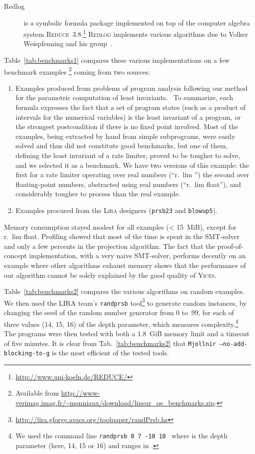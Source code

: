 \begin{description}
\item[Redlog\footnotemark] is a symbolic formula package implemented on top of the computer algebra system \textsc{Reduce}~3.8.\footnote{\url{http://www.uni-koeln.de/REDUCE/}} \textsc{Redlog} implements various algorithms due to Volker Weispfenning and his group~\cite{LW93}.
\end{description}

Table~\ref{tab:benchmarks1} compares these various implementations on a few benchmark examples
\footnote{Available from \url{http://www-verimag.imag.fr/~monniaux/download/linear_qe_benchmarks.zip}.} coming from two sources:
\begin{enumerate}
\item Examples produced from problems of program analysis following our method for the parametric computation of least invariants.~\cite{Monniaux_SAS07}
To summarize, each formula expresses the fact that a set of program states (such as a product of intervals for the numerical variables) is the least invariant of a program, or the strongest postcondition if there is no fixed point involved. Most of the examples, being extracted by hand from simple subprograms, were easily solved and thus did not constitute good benchmarks, but one of them, defining the least invariant of a rate limiter, proved to be tougher to solve, and we selected it as a benchmark. We have two versions of this example: the first for a rate limiter operating over real numbers (``r.~lim '')
the second over floating-point numbers, abstracted using real numbers (``r.~lim float''), and considerably tougher to process than the real example.
\item Examples procured from the \textsc{Lira} designers (\texttt{prsb23} and \texttt{blowup5}).
\end{enumerate}

Memory consumption stayed modest for all examples (< 15~MiB), except for r.~lim float.
Profiling showed that most of the time is spent in the SMT-solver and only a few percents in the projection algorithm. The fact that the proof-of-concept implementation, with a very naive SMT-solver, performs decently on an example where other algorithms exhaust memory shows that the performance of our algorithm cannot be solely explained by the good quality of \textsc{Yices}.

Table~\ref{tab:benchmarks2} compares the various algorithms on random examples.
We then used the LIRA team's \texttt{randprsb} tool\footnote{\url{http://lira.gforge.avacs.org/toolpaper/randPrsb.hs}}
to generate  random instances, by changing the seed of the random
number generator from 0 to~99, for each of three values (14, 15, 16) of the depth parameter, which measures complexity.\footnote{We used the command line \texttt{randprsb 0 7 -10 10  } where  is the depth parameter (here, 14, 15 or 16) and  ranges in .}
The programs were then tested with both
a 1.8~GiB memory limit and a timeout of five minutes.
It is clear from Tab.~\ref{tab:benchmarks2} that
\texttt{Mjollnir --no-add-blocking-to-g} is the most efficient of the
tested tools.

